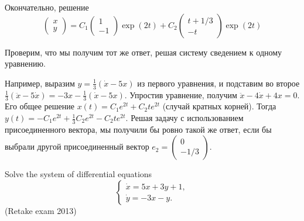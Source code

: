 \begin{solution}
Окончательно, решение 
\[
\left(\begin{array}{c} {x} \\ {y} \end{array}\right)=C_{1} \left(\begin{array}{c} {1} \\ {-1} \end{array}\right)\exp (2t)+C_{2} \left(\begin{array}{c} {t+1/3} \\ {-t} \end{array}\right)\exp (2t)
\]

Проверим, что мы получим тот же ответ, решая систему сведением к одному уравнению.

Например, выразим $y=\frac{1}{3} (\dot{x}-5x)$ из первого уравнения, и подставим во второе $\frac{1}{3} (\ddot{x}-5\dot{x})=-3x-\frac{1}{3} (\dot{x}-5x)$. Упростив уравнение, получим $\ddot{x}-4\dot{x}+4x=0$. Его общее решение $x(t)=C_{1} e^{2t} +C_{2} te^{2t} $ (случай кратных корней). Тогда $y(t)=-C_{1} e^{2t} +\frac{1}{3} C_{2} e^{2t} -C_{2} te^{2t} $. Решая задачу с использованием присоединенного вектора, мы получили бы ровно такой же ответ, если бы выбрали другой присоединенный вектор $e_{2} =\left(\begin{array}{c} {0} \\ {-1/3} \end{array}\right)$.
\end{solution}





\begin{problem}
Solve the system of differential equations
\[
\begin{cases} 
\dot{x}=5x+3y+1, \\ 
\dot{y}=-3x-y.
\end{cases} 
\]
(Retake exam 2013)
\end{problem}


